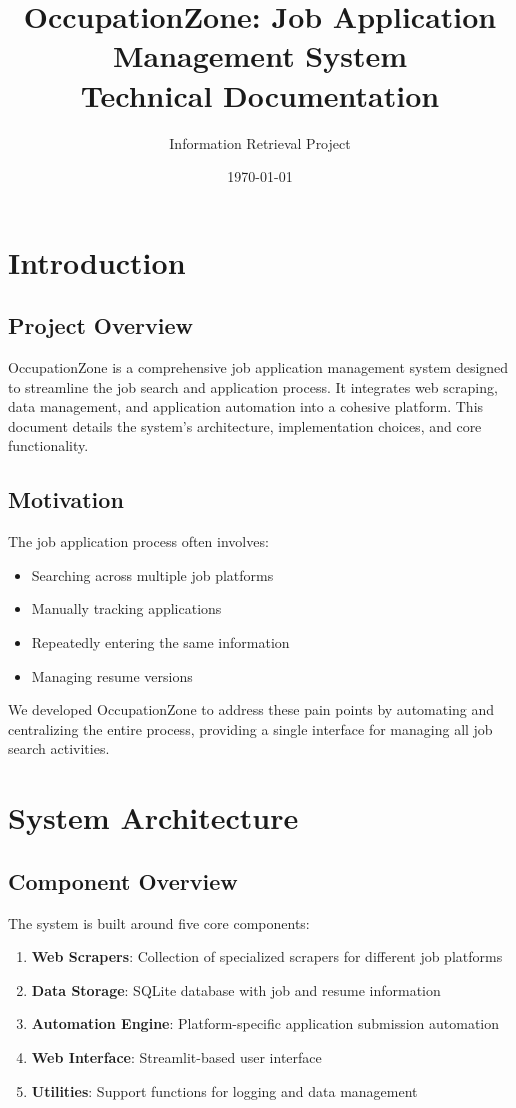 \documentclass[12pt,a4paper]{report}
\title{OccupationZone: Job Application Management System\\
\large Technical Documentation}
\author{Information Retrieval Project}
\date{\today}
\begin{document}
\maketitle
\tableofcontents

\chapter{Introduction}

\section{Project Overview}
OccupationZone is a comprehensive job application management system designed to streamline the job search and application process. It integrates web scraping, data management, and application automation into a cohesive platform. This document details the system's architecture, implementation choices, and core functionality.

\section{Motivation}
The job application process often involves:
\begin{itemize}
    \item Searching across multiple job platforms
    \item Manually tracking applications
    \item Repeatedly entering the same information
    \item Managing resume versions
\end{itemize}

We developed OccupationZone to address these pain points by automating and centralizing the entire process, providing a single interface for managing all job search activities.

\chapter{System Architecture}

\section{Component Overview}
The system is built around five core components:

\begin{tcolorbox}[colback=backcolour,title=System Components]
\begin{enumerate}
    \item \textbf{Web Scrapers}: Collection of specialized scrapers for different job platforms
    \item \textbf{Data Storage}: SQLite database with job and resume information
    \item \textbf{Automation Engine}: Platform-specific application submission automation
    \item \textbf{Web Interface}: Streamlit-based user interface
    \item \textbf{Utilities}: Support functions for logging and data management
\end{enumerate}
\end{tcolorbox}
\end{document}
